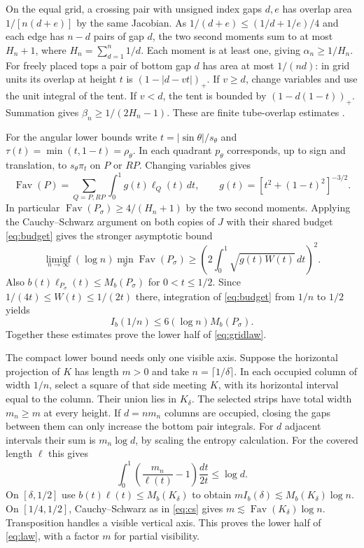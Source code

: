 \documentclass[11pt,reqno]{amsart}
\newcommand{\Fav}{\operatorname{Fav}}
\begin{document}
On the equal grid, a crossing pair with unsigned index gaps $d,e$ has overlap area $1/[n(d+e)]$ by the same Jacobian. As $1/(d+e)\le(1/d+1/e)/4$ and each edge has $n-d$ pairs of gap $d$, the two second moments sum to at most $H_n+1$, where $H_n=\sum_{d=1}^n1/d$. Each moment is at least one, giving $\alpha_n\ge1/H_n$. For freely placed tops a pair of bottom gap $d$ has area at most $1/(nd)$: in grid units its overlap at height $t$ is $(1-|d-vt|)_+$. If $v\ge d$, change variables and use the unit integral of the tent. If $v<d$, the tent is bounded by $(1-d(1-t))_+$. Summation gives $\beta_n\ge1/(2H_n-1)$. These are finite tube-overlap estimates \cite{Cordoba}.

For the angular lower bounds write $t=|\sin\theta|/s_\theta$ and $\tau(t)=\min(t,1-t)=\rho_\theta$. In each quadrant $p_\theta$ corresponds, up to sign and translation, to $s_\theta\pi_t$ on $P$ or $RP$. Changing variables gives
\[
 \Fav(P)=\sum_{Q=P,RP}\int_0^1g(t)\ell_Q(t)\,dt,\qquad
 g(t)=[t^2+(1-t)^2]^{-3/2}.
\]
In particular $\Fav(P_\sigma)\ge4/(H_n+1)$ by the two second moments. Applying the Cauchy--Schwarz argument on both copies of $J$ with their shared budget \eqref{eq:budget} gives the stronger asymptotic bound
\[
 \liminf_{n\to\infty}(\log n)\min_\sigma\Fav(P_\sigma)
 \ge \left(2\int_0^1\sqrt{g(t)W(t)}\,dt\right)^2 .
\]
Also $b(t)\ell_{P_\sigma}(t)\le M_b(P_\sigma)$ for $0<t\le1/2$. Since $1/(4t)\le W(t)\le1/(2t)$ there, integration of \eqref{eq:budget} from $1/n$ to $1/2$ yields
\begin{equation}\label{eq:lower}
 I_b(1/n)\le 6(\log n)M_b(P_\sigma).
\end{equation}
Together these estimates prove the lower half of \eqref{eq:gridlaw}.

The compact lower bound needs only one visible axis. Suppose the horizontal projection of $K$ has length $m>0$ and take $n=\lceil1/\delta\rceil$. In each occupied column of width $1/n$, select a square of that side meeting $K$, with its horizontal interval equal to the column. Their union lies in $K_\delta$. The selected strips have total width $m_n\ge m$ at every height. If $d=nm_n$ columns are occupied, closing the gaps between them can only increase the bottom pair integrals. For $d$ adjacent intervals their sum is $m_n\log d$, by scaling the entropy calculation. For the covered length $\ell$ this gives
\[
 \int_0^1\!\left(\frac{m_n}{\ell(t)}-1\right)\frac{dt}{2t}\le\log d .
\]
On $[\delta,1/2]$ use $b(t)\ell(t)\le M_b(K_\delta)$ to obtain $m I_b(\delta)\lesssim M_b(K_\delta)\log n$. On $[1/4,1/2]$, Cauchy--Schwarz as in \eqref{eq:cs} gives $m\lesssim\Fav(K_\delta)\log n$. Transposition handles a visible vertical axis. This proves the lower half of \eqref{eq:law}, with a factor $m$ for partial visibility.
\end{document}

